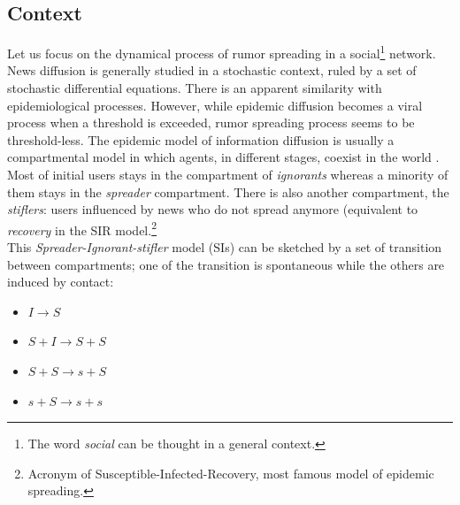 \subsection{Context}
Let us focus on the dynamical process of rumor spreading in a social\footnote{The word \textit{social} can be thought in a general context.} network.
\\ News diffusion is generally studied in a stochastic context, ruled by a set of stochastic differential equations. \cite{chen2013information}
 There is an apparent similarity with epidemiological processes. 
However, while epidemic diffusion becomes a viral process when a threshold is exceeded, rumor spreading process seems to be threshold-less.
 The epidemic model of information diffusion is usually a compartmental model in which agents, in different stages, coexist in the world \cite{barrat2008dynamical}.
 Most of initial users stays in the compartment of \textit{ignorants} whereas a minority of them stays in the \textit{spreader} compartment.
 There is also another compartment, the \textit{stiflers}: users influenced by news who do not spread anymore (equivalent to \textit{recovery} in the SIR model.\footnote{Acronym of Susceptible-Infected-Recovery, most famous model of epidemic spreading.}
\\ This \textit{Spreader-Ignorant-stifler} model (SIs) can be sketched by a set of transition between compartments; one of the transition is spontaneous while the others are induced by contact:
\begin{itemize}
\item$ I \longrightarrow S$
\item $S+I \longrightarrow S + S$

\item $S + S \longrightarrow s + S$

\item $s + S \longrightarrow  s + s$
\end{itemize}


